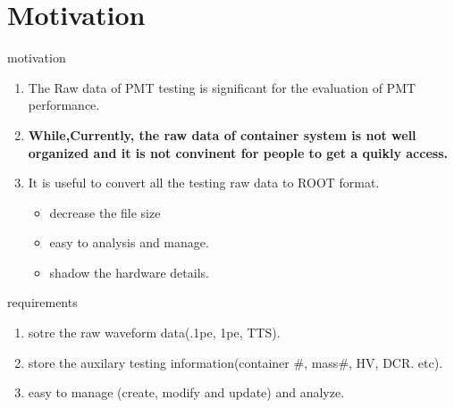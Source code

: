 
\section{Motivation}
\begin{frame}{ motivation}
\begin{enumerate}
\item 	The Raw data of PMT testing is significant for the evaluation of PMT performance. 
\item \textbf{While,Currently, the raw data of container system is not well organized and it is  not convinent for people to get a quikly access.  }
\item \alert{It is useful to convert all the testing raw data to ROOT format.}
\begin{itemize}
\item decrease the file size
\item easy to analysis and manage.
\item shadow the hardware details.
\end{itemize}
\end{enumerate}
\end{frame}
\begin{frame}{requirements}
\begin{enumerate}
\item sotre the raw waveform data(.1pe, 1pe, TTS).
\item store the auxilary testing information(container #, mass#, HV, DCR. etc).
\item easy to manage (create, modify and update) and analyze.
\end{enumerate}
\end{frame}
